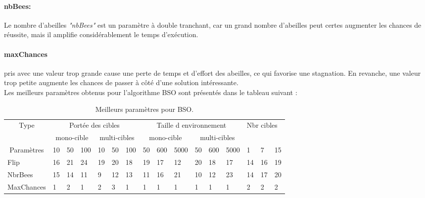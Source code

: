 	\paragraph{nbBees:} Le nombre d'abeilles \textit{"nbBees"} est un paramètre à double tranchant, car un grand nombre d'abeilles peut certes augmenter les chances de réussite, mais il amplifie considérablement le temps d'exécution.
	
	\paragraph{maxChances} pris avec une valeur trop grande cause une perte de temps et d'effort des abeilles, ce qui favorise une stagnation. En revanche, une valeur trop petite augmente les chances de passer à côté d'une solution intéressante. \\
	
	Les meilleurs paramètres obtenus pour l'algorithme BSO sont présentés dans le tableau suivant :
\begin{table}[h]
	\begin{tabular}{|l|p{0.3cm}|p{0.3cm}|p{0.3cm}|p{0.3cm}|p{0.3cm}|p{0.3cm}|p{0.5cm}|p{0.5cm}|p{0.6cm}|p{0.5cm}|p{0.5cm}|p{0.6cm}|p{0.3cm}|p{0.3cm}|p{0.3cm}|}
		\hline
		\multicolumn{1}{|c|}{\multirow{2}{*}{Type}} & \multicolumn{6}{c|}{Portée des cibles}                              & \multicolumn{6}{c|}{Taille d environnement}                         & \multicolumn{3}{l|}{\multirow{2}{*}{Nbr cibles}} \\ \cline{2-13}
		\multicolumn{1}{|c|}{}                                         & 
		\multicolumn{3}{c|}{mono-cible} & \multicolumn{3}{c|}{multi-cibles} & \multicolumn{3}{c|}{mono-cible} & \multicolumn{3}{c|}{multi-cibles} & \multicolumn{3}{l|}{}                                  \\ \hline
		\multicolumn{1}{|c|}{Paramètres}                               & 10       & 50       & 100       & 10        & 50        & 100       & 50       & 600      & 5000      & 50        & 600       & 5000      & 1                & 7                & 15               \\ \hline \hline
		Flip                                                           & 16       & 21       & 24        & 19        & 20        & 18        & 19       & 17       & 12        & 20        & 18        & 17        & 14               & 16               & 19               \\ \hline
		NbrBees                                                        & 15       & 14       & 11        & 9         & 12        & 13        & 11       & 16       & 21        & 10        & 12        & 23        & 14               & 17               & 20               \\ \hline
		MaxChances                                                     & 1        & 2        & 1         & 2         & 3         & 1         & 1        & 1        & 1         & 1         & 1         & 1         & 2                & 2                & 2                \\ \hline
	\end{tabular}
	\caption{Meilleurs paramètres pour BSO.}
\end{table}
	
